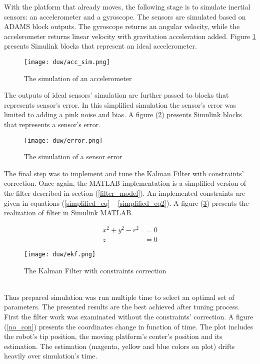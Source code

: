 With the platform that already moves, the following stage is to simulate inertial sensors: an accelerometer and a gyroscope. The sensors are simulated based on ADAMS block outputs. The gyroscope returns an angular velocity, while the accelerometer returns linear velocity with gravitation acceleration added. Figure \ref{acc_sym} presents Simulink blocks that represent an ideal accelerometer.

\begin{figure}[!h]
	\centering
	\texttt{[image: duw/acc\_sim.png]}
	\caption{The simulation of an accelerometer}
	\label{acc_sym}
\end{figure}

The outputs of ideal sensors' simulation are further passed to blocks that represents sensor's error. In this simplified simulation the sensor's error was limited to adding a pink noise and bias. A figure (\ref{error_sensor}) presents Simulink blocks that represents a sensor's error.

\begin{figure}[!h]
	\centering
	\texttt{[image: duw/error.png]}
	\caption{The simulation of a sensor error}
	\label{error_sensor}
\end{figure}

The final step was to implement and tune the Kalman Filter with constraints' correction. Once again, the MATLAB implementation is a simplified version of the filter described in section (\ref{filter_model}). An implemented constraints are given in equations (\ref{simplified_eq} -- \ref{simplified_eq2}).  A figure (\ref{ekf_sim}) presents the realization of filter in Simulink MATLAB.

\begin{align}
	x^2 + y^2 - r^2 &= 0
	\label{simplified_eq}\\
	z &= 0
	\label{simplified_eq2}
\end{align}

\begin{figure}[!h]
	\centering
	\texttt{[image: duw/ekf.png]}
	\caption{The Kalman Filter with constraints correction}
	\label{ekf_sim}
\end{figure}
\ \\

Thus prepared simulation was run multiple time to select an optimal set of parameters. The presented results are the best achieved after tuning process. First the filter work was examinated without the constraints' correction. A figure (\ref{no_con}) presents the coordinates change in function of time. The plot includes the robot's tip position, the moving platform's center's position and its estimation. The estimation (magenta, yellow and blue colors on plot) drifts heavily over simulation's time.\\

